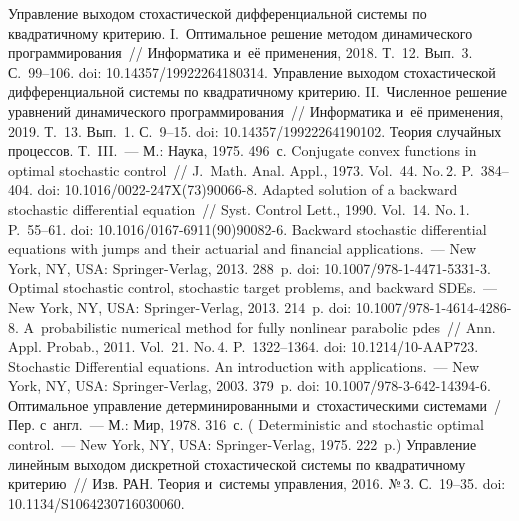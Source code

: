 \begin{multicols}{2}
{\small\frenchspacing
 {%
 \begin{thebibliography}{99}
 Управление выходом 
стохастической дифференциальной системы по квад\-ра\-тич\-но\-му критерию. 
I.~Оптимальное решение методом динамического программирования~// 
Информатика и~её применения, 2018. Т.~12. Вып.~3. С.~99--106.  doi: 
10.14357/19922264180314.
 Управление выходом 
стохастической дифференциальной системы по квад\-ра\-тич\-но\-му критерию. 
II.~Численное решение уравнений динамического программирования~// 
Информатика и~её применения, 2019. Т.~13. Вып.~1. С.~9--15. doi: 
10.14357/19922264190102.
 Теория случайных процессов. 
Т.~III.~--- М.: Наука, 1975. 496~с.
 Conjugate convex functions in optimal stochastic control~// 
J.~Math. Anal. Appl., 1973. Vol.~44.  No.\,2. P.~384--404. doi: 
10.1016/0022-247X(73)90066-8.
 Adapted solution of a backward stochastic 
differential equation~// Syst. Control Lett., 1990. Vol.~14. No.\,1.  
P.~55--61. doi: 10.1016/0167-6911(90)90082-6.
 Backward stochastic differential equations with jumps and their 
actuarial and financial applications.~--- New York, NY, USA:  
Springer-Verlag, 2013. 288~p. doi: 10.1007/978-1-4471-5331-3.
 Optimal stochastic control, stochastic target problems, and 
backward SDEs.~--- New York, NY, USA: Springer-Verlag, 2013. 214~p. doi: 
10.1007/978-1-4614-4286-8.
 A~probabilistic numerical method for fully 
nonlinear parabolic pdes~// Ann. Appl. Probab., 2011. Vol.~21. No.\,4. 
P.~1322--1364. doi: 10.1214/10-AAP723.
 Stochastic Differential equations. An introduction 
with applications.~--- New York, NY, USA: Springer-Verlag, 2003. 379~p. 
doi: 10.1007/978-3-642-14394-6.
 Оптимальное управление 
детерминированными и~стохастическими системами~/ Пер. с~англ.~--- М.: 
Мир, 1978. 316~с. ( Deterministic and 
stochastic optimal control.~--- New York, NY, USA: Springer-Verlag, 1975. 
222~p.)
 Управление линейным выходом дискретной 
стохастической системы по квадратичному критерию~// Изв. РАН. Теория 
и~системы управления, 2016. №\,3. С.~19--35. doi: 
10.1134/S1064230716030060.
 \end{thebibliography}

 }
 }

\end{multicols}

